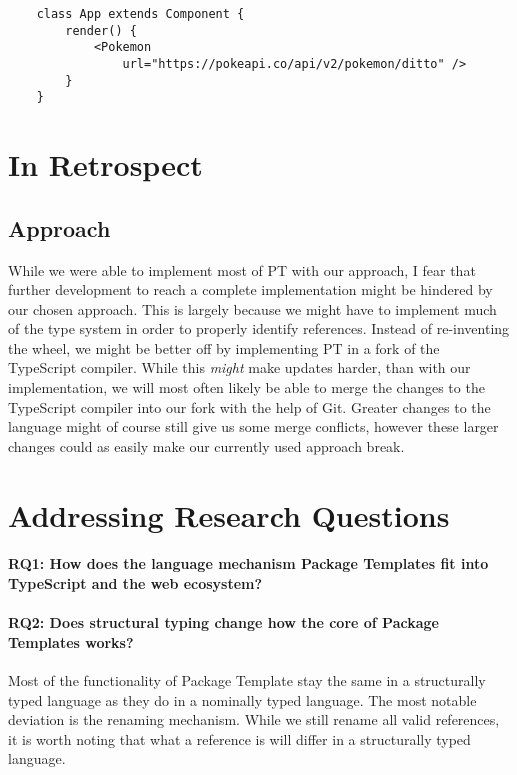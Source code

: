 \begin{verbatim}
    class App extends Component {
        render() {
            <Pokemon
                url="https://pokeapi.co/api/v2/pokemon/ditto" />
        }
    }
\end{verbatim}

\section{In Retrospect}\label{sec:in-retrospect}

\subsection{Approach}\label{subsec:result-approach}

While we were able to implement most of PT with our approach, I fear that further development to reach a complete implementation might be hindered by our chosen approach.
This is largely because we might have to implement much of the type system in order to properly identify references.
Instead of re-inventing the wheel, we might be better off by implementing PT in a fork of the TypeScript compiler.
While this \textit{might} make updates harder, than with our implementation, we will most often likely be able to merge the changes to the TypeScript compiler into our fork with the help of Git.
Greater changes to the language might of course still give us some merge conflicts, however these larger changes could as easily make our currently used approach break.

\section{Addressing Research Questions}\label{sec:adressing-research-questions}


\paragraph{RQ1: How does the language mechanism Package Templates fit into TypeScript and the web ecosystem?}



\paragraph{RQ2: Does structural typing change how the core of Package Templates works?}

Most of the functionality of Package Template stay the same in a structurally typed language as they do in a nominally typed language.
The most notable deviation is the renaming mechanism.
While we still rename all valid references, it is worth noting that what a reference is will differ in a structurally typed language.

